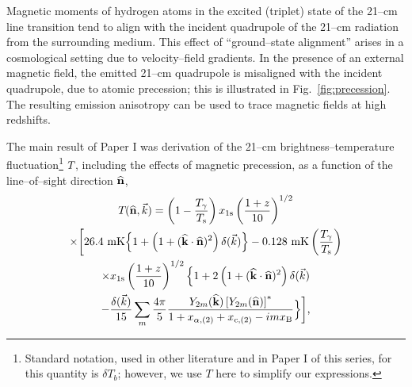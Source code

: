 \documentclass[aps,prd,twocolumn,floatfix,showpacs,superscriptaddress,nofootinbib]{revtex4-1}
\newcommand{\beq}{\begin{equation}}
\newcommand{\eeq}{\end{equation}}
\newcommand{\bga}{\begin{gathered}}
\newcommand{\ega}{\end{gathered}}
\begin{document}
Magnetic moments of hydrogen atoms in the excited (triplet) state of the 21--cm line transition tend to align with the incident quadrupole of the 21--cm radiation from the surrounding medium. This effect of ``ground--state alignment'' \cite{Yan08,Yan12} arises in a cosmological setting due to velocity--field gradients. In the presence of an external magnetic field, the emitted 21--cm quadrupole is misaligned with the incident quadrupole, due to atomic precession; this is illustrated in Fig.~\ref{fig:precession}. The resulting emission anisotropy can be used to trace magnetic fields at high redshifts.

The main result of Paper I was derivation of the 21--cm brightness--temperature fluctuation\footnote{Standard notation, used in other literature and in Paper I of this series, for this quantity is $\delta T_b$; however, we use $T$ here to simplify our expressions.} $T_{\rm }$, including the effects of magnetic precession, as a function of the line--of--sight direction ${\bf{\widehat n}}$, 
\beq
\bga
   T_{\rm }({\bf{\widehat n}}, {{\vec k}}) = \left( 1 - \frac{T_\gamma}{T_{\rm s}} \right) x_{1{\rm s}} \left( \frac{1+z}{10} \right)^{1/2} \\
  \times \biggl[ 26.4 \ {\rm mK} \Bigl\{ 1 + \left(1 + ({\bf{\widehat k}} \cdot {\bf{\widehat n}})^2 \right)\delta(\vec k) \Bigr\}  
- 0.128 \ {\rm mK} \left( \frac{T_\gamma}{T_{\rm s}} \right)\\ \times x_{1{\rm s}} \left( \frac{1+z}{10} \right)^{1/2}  
 \Bigl\{ 1 + 2 \left(1 + ({\bf{\widehat k}} \cdot {\bf{\widehat n}})^2 \right)\delta(\vec k) \\
- \frac{ \delta(\vec k) }{15} \sum_m \frac{4\pi}{5} \frac{Y_{2 m}({\bf{\widehat k}}) \left[ Y_{2 m} ({\bf{\widehat n}}) \right]^* }{1 + x_{ \alpha, (2) } + x_{{\rm c}, (2)} - i m x_{\rm B}} \Bigr\} \biggr] \mbox{,} 
\ega
\label{eq:tbsoln}
\eeq
\end{document}
